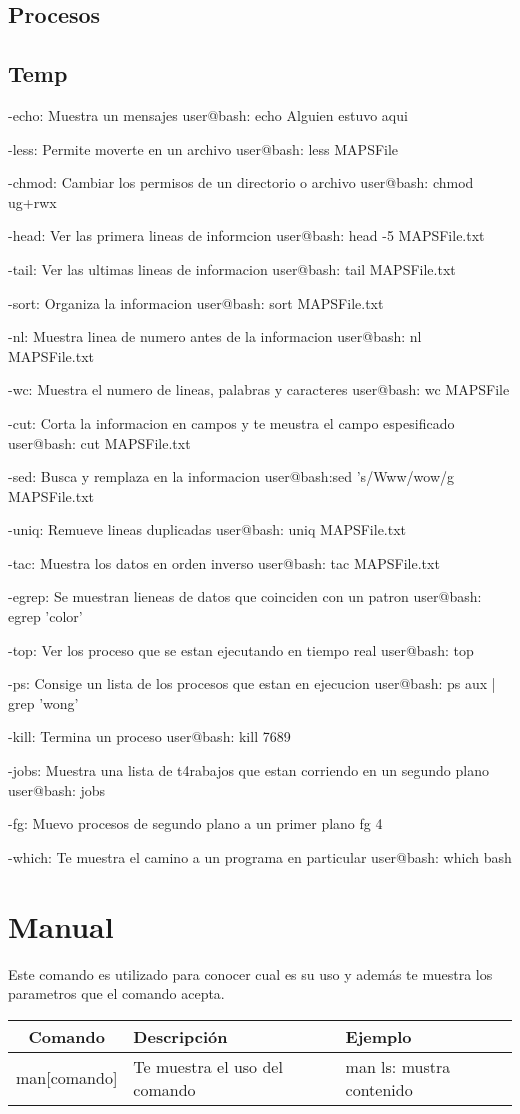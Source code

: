 \documentclass[12pt]{article}
\begin{document}
\subsection{Procesos}
\subsection{Temp}
-echo: Muestra un mensajes
user@bash: echo Alguien estuvo aqui

-less: Permite moverte en un archivo
user@bash: less MAPSFile

-chmod: Cambiar los permisos de un directorio o archivo
user@bash: chmod ug+rwx

-head: Ver las primera lineas de informcion
user@bash: head -5 MAPSFile.txt

-tail: Ver las ultimas lineas de informacion
user@bash: tail MAPSFile.txt

-sort: Organiza la informacion
user@bash: sort MAPSFile.txt

-nl: Muestra linea de numero antes de la informacion
user@bash: nl MAPSFile.txt

-wc: Muestra el numero de lineas, palabras y caracteres
user@bash: wc MAPSFile

-cut: Corta la informacion en campos y te meustra el campo espesificado
user@bash: cut MAPSFile.txt

-sed: Busca y remplaza en la informacion
user@bash:sed 's/Www/wow/g MAPSFile.txt

-uniq: Remueve lineas duplicadas
user@bash: uniq MAPSFile.txt

-tac: Muestra los datos en orden inverso
user@bash: tac MAPSFile.txt

-egrep: Se muestran lieneas de datos que coinciden con un patron
user@bash: egrep 'color'

-top: Ver los proceso que se estan ejecutando en tiempo real
user@bash: top

-ps: Consige un lista de los procesos que estan en ejecucion
user@bash: ps aux | grep 'wong'

-kill: Termina un proceso
user@bash: kill 7689

-jobs: Muestra una lista de t4rabajos que estan corriendo en un segundo plano
user@bash: jobs 

-fg: Muevo procesos de segundo plano a un primer plano
fg 4

-which: Te muestra el camino a un programa en particular
user@bash: which bash

\section{Manual}
Este comando es utilizado para conocer cual es su uso y además te muestra los parametros que el comando acepta. \\ 
\begin{tabular}{|c|l|l|}
\hline
Comando & Descripción & Ejemplo \\
\hline
man[comando] & Te muestra el uso del comando & man ls: mustra contenido\\ \hline
\end{tabular} 

\end{document}
